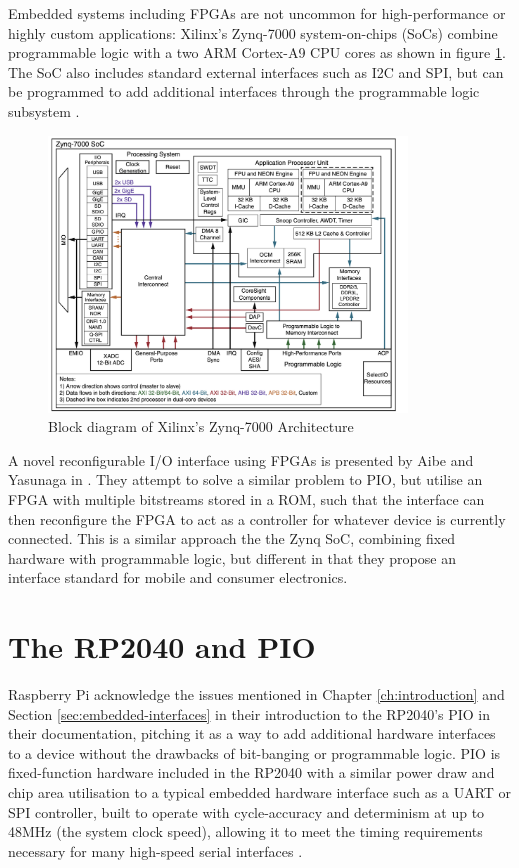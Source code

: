 Embedded systems including FPGAs are not uncommon for high-performance or highly custom applications: Xilinx's Zynq-7000 system-on-chips (SoCs) combine programmable logic with a two ARM Cortex-A9 CPU cores as shown in figure \ref{fig:zynq}. The SoC also includes standard external interfaces such as I2C and SPI, but can be programmed to add additional interfaces through the programmable logic subsystem \cite{zynq}.

\begin{figure}[H]
    \centering
    \includegraphics[width=0.85\textwidth]{../img/zynq.png}
    \caption{Block diagram of Xilinx's Zynq-7000 Architecture \cite{zynq}}
    \label{fig:zynq}
\end{figure}

A novel reconfigurable I/O interface using FPGAs is presented by Aibe and Yasunaga in \cite{metaio}. They attempt to solve a similar problem to PIO, but utilise an FPGA with multiple bitstreams stored in a ROM, such that the interface can then reconfigure the FPGA to act as a controller for whatever device is currently connected. This is a similar approach the the Zynq SoC, combining fixed hardware with programmable logic, but different in that they propose an interface standard for mobile and consumer electronics.

\section{The RP2040 and PIO}
Raspberry Pi acknowledge the issues mentioned in Chapter \ref{ch:introduction} and Section \ref{sec:embedded-interfaces} in their introduction to the RP2040's PIO in their documentation, pitching it as a way to add additional hardware interfaces to a device without the drawbacks of bit-banging or programmable logic. PIO is fixed-function hardware included in the RP2040 with a similar power draw and chip area utilisation to a typical embedded hardware interface such as a UART or SPI controller, built to operate with cycle-accuracy and determinism at up to 48MHz (the system clock speed), allowing it to meet the timing requirements necessary for many high-speed serial interfaces \cite{rp2040}.

